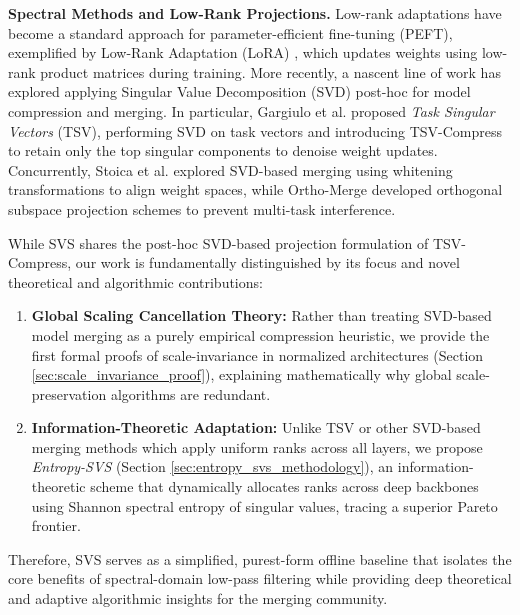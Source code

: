\textbf{Spectral Methods and Low-Rank Projections.}
Low-rank adaptations have become a standard approach for parameter-efficient fine-tuning (PEFT), exemplified by Low-Rank Adaptation (LoRA) \cite{hu2021lora}, which updates weights using low-rank product matrices during training. More recently, a nascent line of work has explored applying Singular Value Decomposition (SVD) post-hoc for model compression and merging. In particular, Gargiulo et al. \cite{gargiulo2025tsv} proposed \emph{Task Singular Vectors} (TSV), performing SVD on task vectors and introducing TSV-Compress to retain only the top singular components to denoise weight updates. Concurrently, Stoica et al. \cite{stoica2025svdmerging} explored SVD-based merging using whitening transformations to align weight spaces, while Ortho-Merge \cite{orthomerge2025} developed orthogonal subspace projection schemes to prevent multi-task interference. 

While SVS shares the post-hoc SVD-based projection formulation of TSV-Compress, our work is fundamentally distinguished by its focus and novel theoretical and algorithmic contributions:
\begin{enumerate}
    \item \textbf{Global Scaling Cancellation Theory:} Rather than treating SVD-based model merging as a purely empirical compression heuristic, we provide the first formal proofs of scale-invariance in normalized architectures (Section \ref{sec:scale_invariance_proof}), explaining mathematically why global scale-preservation algorithms are redundant.
    \item \textbf{Information-Theoretic Adaptation:} Unlike TSV or other SVD-based merging methods which apply uniform ranks across all layers, we propose \emph{Entropy-SVS} (Section \ref{sec:entropy_svs_methodology}), an information-theoretic scheme that dynamically allocates ranks across deep backbones using Shannon spectral entropy of singular values, tracing a superior Pareto frontier.
\end{enumerate}
Therefore, SVS serves as a simplified, purest-form offline baseline that isolates the core benefits of spectral-domain low-pass filtering while providing deep theoretical and adaptive algorithmic insights for the merging community.

